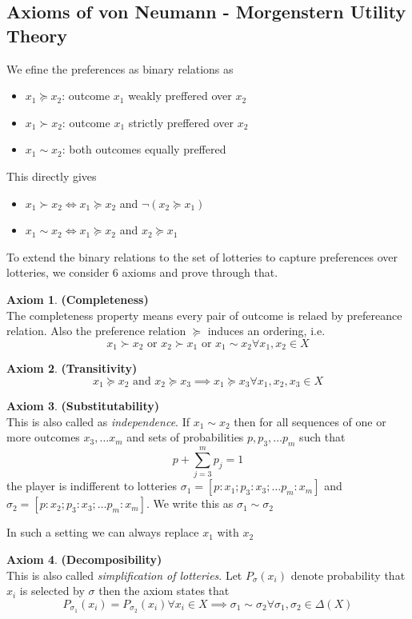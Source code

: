 \documentclass{article}
\theoremstyle{definition}
\newtheorem{ax}{Axiom}[section]
\begin{document}
\subsection{Axioms of von Neumann - Morgenstern Utility Theory}
We efine the preferences as binary relations as 
\begin{itemize}
	\item $x_1 \succeq x_2$: outcome $x_1$ weakly preffered over $x_2$
	\item $x_1 \succ x_2$: outcome $x_1$ strictly preffered over $x_2$
	\item $x_1\sim x_2$: both outcomes equally preffered
\end{itemize}
This directly gives
\begin{itemize}
	\item $x_1\succ x_2 \iff x_1 \succeq x_2$ and $\neg(x_2 \succeq x_1)$
	\item $x_1 \sim x_2 \iff x_1 \succeq x_2$ and $x_2 \succeq x_1$
\end{itemize}
To extend the binary relations to the set of lotteries to capture preferences over lotteries, we consider 6 axioms and prove through that.
\begin{ax}
\textbf{(Completeness)}\\

The completeness property means every pair of outcome is relaed by prefereance relation. Also the preference relation $\succeq$ induces an ordering, i.e. $$x_1\succ x_2 \text{ or } x_2 \succ x_1 \text{ or } x_1 \sim x_2 \forall x_1,x_2 \in X$$
\end{ax}
\begin{ax}
\textbf{(Transitivity)}\\
$$x_1\succeq x_2 \text{ and } x_2\succeq x_3 \implies x_1\succeq x_3 \forall x_1,x_2,x_3 \in X$$
\end{ax}
\begin{ax}
\textbf{(Substitutability)}\\

This is also called as \textit{independence}. If $x_1\sim x_2$ then for all sequences of one or more outcomes $x_3, \dots x_m$ and sets of probabilities $p, p_3,\dots p_m$ such that $$p+\sum_{j=3}^m p_j = 1$$ the player is indifferent to lotteries $\sigma_1 = [p:x_1; p_3:x_3; \dots p_m:x_m]$ and $\sigma_2 = [p:x_2; p_3:x_3; \dots p_m:x_m]$. We write this as $\sigma_1 \sim \sigma_2$
\end{ax}
In such a setting we can always replace $x_1$ with $x_2$
\begin{ax}
\textbf{(Decomposibility)}\\

This is also called \textit{simplification of lotteries}. Let $P_{\sigma}(x_i)$ denote probability that $x_i$ is selected by $\sigma$ then the axiom states that $$P_{\sigma_1}(x_i) = P_{\sigma_2}(x_i) \forall x_i \in X\implies \sigma_1 \sim \sigma_2 \forall \sigma_1,\sigma_2 \in \Delta(X)$$
\end{ax}
\end{document}
